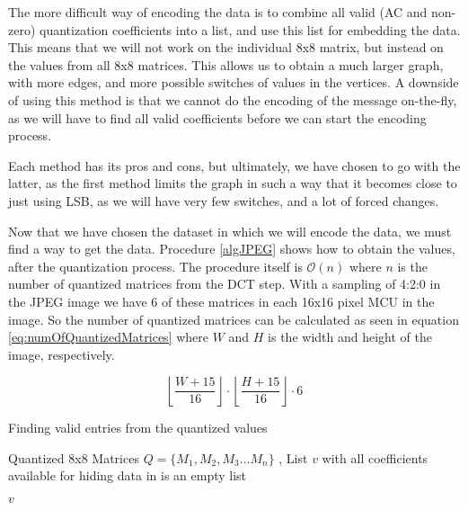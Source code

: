 The more difficult way of encoding the data is to combine all valid (AC and non-zero) quantization coefficients into a list, and use this list for embedding the data. 
This means that we will not work on the individual 8x8 matrix, but instead on the values from all 8x8 matrices. 
This allows us to obtain a much larger graph, with more edges, and more possible switches of values in the vertices. 
A downside of using this method is that we cannot do the encoding of the message on-the-fly, as we will have to find all valid coefficients before we can start the encoding process.

Each method has its pros and cons, but ultimately, we have chosen to go with the latter, as the first method limits the graph in such a way that it becomes close to just using LSB, as we will have very few switches, and a lot of forced changes.

Now that we have chosen the dataset in which we will encode the data, we must find a way to get the data. 
Procedure \ref{algJPEG} shows how to obtain the values, after the quantization process. 
The procedure itself is $\mathcal{O}(n)$ where $n$ is the number of quantized matrices from the DCT step. 
With a sampling of 4:2:0 in the JPEG image we have 6 of these matrices in each 16x16 pixel MCU in the image. 
So the number of quantized matrices can be calculated as seen in equation \ref{eq:numOfQuantizedMatrices} where $W$ and $H$ is the width and height of the image, respectively.

\begin{equation}
\label{eq:numOfQuantizedMatrices}
\left \lfloor \frac{W + 15}{16}\right \rfloor \cdot \left \lfloor \frac{H + 15}{16}\right \rfloor \cdot 6
\end{equation}

\begin{algorithm}
\caption{Finding valid entries from the quantized values}
\label{algJPEG}
\begin{algorithmic}
\REQUIRE Quantized 8x8 Matrices $Q = \{ M_1, M_2, M_3 \ldots M_n \}$ ,
\ENSURE List $v$ with all coefficients available for hiding data in
 is an empty list

            \ENDIF
        \ENDFOR
    \ENDFOR
\ENDFOR

\RETURN $v$
\end{algorithmic}
\end{algorithm}

